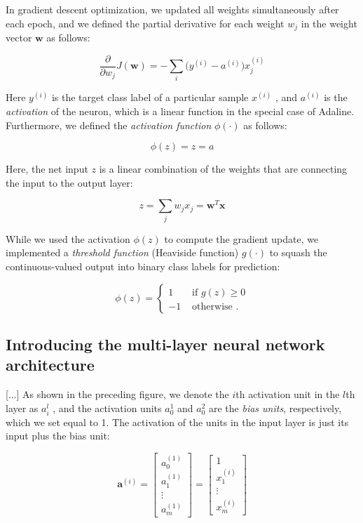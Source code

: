 \documentclass[letterpaper]{report}
\begin{document}
In gradient descent optimization, we updated all weights simultaneously after each epoch, and we defined the partial derivative for each weight $w_j$ in the weight vector
$\mathbf{w}$ as follows:

\[
\frac{\partial}{\partial w_j} J(\mathbf{w}) = - \sum_i \big( y^{(i)} - a^{(i)} \big) x_{j}^{(i)}
\]

Here $y^{(i)}$ is the target class label of a particular sample $x^{(i)}$ , and $a^{(i)}$ is the \textit{activation} of the neuron, which is a linear function in the special case of Adaline. Furthermore, we defined the \textit{activation function} $\phi(\cdot)$ as follows:

\[
\phi(z) = z = a
\]

Here, the net input $z$  is a linear combination of the weights that are connecting the
input to the output layer:

\[
z = \sum_j w_j x_j = \mathbf{w}^T \mathbf{x}
\]

While we used the activation $\phi(z)$ to compute the gradient update, we implemented a \textit{threshold function} (Heaviside function) $g(\cdot)$ to squash the continuous-valued output into binary class labels for prediction:

\[ \phi(z) = \begin{cases} 
      1 & \text{ if } g(z) \ge 0 \\
      -1 & \text{ otherwise }.
   \end{cases}
\]

\subsection{Introducing the multi-layer neural network architecture}

[...] As shown in the preceding figure, we denote the $i$th activation unit in the $l$th layer as $a_{i}^{l}$ , and the activation units $a_{0}^{1}$ and $a_{0}^{2}$ are the \textit{bias units}, respectively, which we set equal to 1. The activation of the units in the input layer is just its input plus the bias unit:

\[
\mathbf{a}^{(i)} = 
\begin{bmatrix}
 a_{0}^{(1)} \\
 a_{1}^{(1)} \\
 \vdots \\
 a_{m}^{(1)}
\end{bmatrix}
= 
\begin{bmatrix}
 1 \\
 x_{1}^{(i)} \\
 \vdots \\
 x_{m}^{(i)}
\end{bmatrix}
\]
\end{document}
